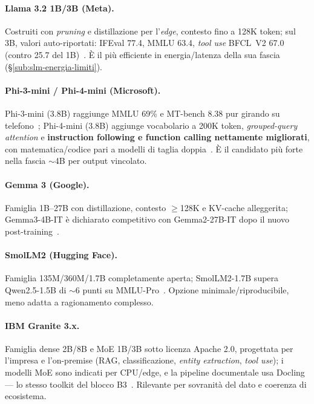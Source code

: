 \paragraph{Llama 3.2 1B/3B (Meta).} Costruiti con \textit{pruning} e distillazione per l'\textit{edge}, contesto fino a 128K token; sul 3B, valori auto-riportati: IFEval 77.4, MMLU 63.4, \textit{tool use} BFCL~V2 67.0 (contro 25.7 del 1B)~\cite{metaai2024llama32}. È il più efficiente in energia/latenza della sua fascia (§\ref{sub:slm-energia-limiti}).

\paragraph{Phi-3-mini / Phi-4-mini (Microsoft).} Phi-3-mini (3.8B) raggiunge MMLU 69\% e MT-bench 8.38 pur girando su telefono~\cite{abdin2024phi3}; Phi-4-mini (3.8B) aggiunge vocabolario a 200K token, \textit{grouped-query attention} e \textbf{instruction following e function calling nettamente migliorati}, con matematica/codice pari a modelli di taglia doppia~\cite{abouelenin2025phi4mini, abdin2024phi4}. È il candidato più forte nella fascia $\sim$4B per output vincolato.

\paragraph{Gemma 3 (Google).} Famiglia 1B--27B con distillazione, contesto $\geq$128K e KV-cache alleggerita; Gemma3-4B-IT è dichiarato competitivo con Gemma2-27B-IT dopo il nuovo post-training~\cite{gemma2025gemma3}.

\paragraph{SmolLM2 (Hugging Face).} Famiglia 135M/360M/1.7B completamente aperta; SmolLM2-1.7B supera Qwen2.5-1.5B di $\sim$6 punti su MMLU-Pro~\cite{benallal2025smollm2}. Opzione minimale/riproducibile, meno adatta a ragionamento complesso.

\paragraph{IBM Granite 3.x.} Famiglia dense 2B/8B e MoE 1B/3B sotto licenza Apache 2.0, progettata per l'impresa e l'on-premise (RAG, classificazione, \textit{entity extraction}, \textit{tool use}); i modelli MoE sono indicati per CPU/edge, e la pipeline documentale usa Docling --- lo stesso toolkit del blocco B3~\cite{granite2024granite30}. Rilevante per sovranità del dato e coerenza di ecosistema.


